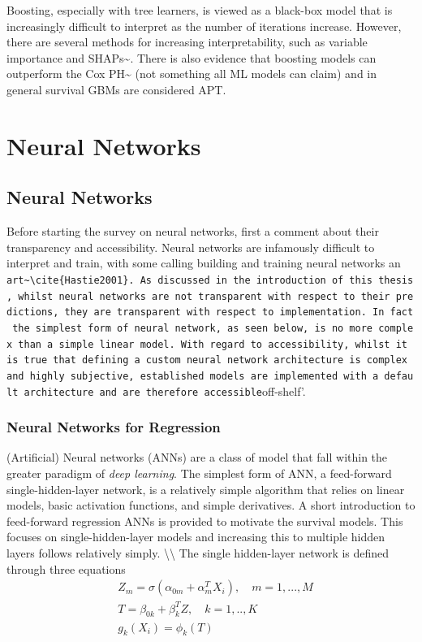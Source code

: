 \documentclass[
  letterpaper,
]{scrbook}
\theoremstyle{plain}
\theoremstyle{definition}
\theoremstyle{remark}
\begin{document}
Boosting, especially with tree learners, is viewed as a black-box model
that is increasingly difficult to interpret as the number of iterations
increase. However, there are several methods for increasing
interpretability, such as variable importance and
SHAPs\textasciitilde{}\cite{Lundberg2017}. There is also evidence that
boosting models can outperform the Cox
PH\textasciitilde{}\cite{Schmid2008b} (not something all ML models can
claim) and in general survival GBMs are considered APT.


\hypertarget{neural-networks}{%
\chapter{Neural Networks}\label{neural-networks}}

\section{Neural Networks}
\label{sec:surv_ml_models_nn}

Before starting the survey on neural networks, first a comment about
their transparency and accessibility. Neural networks are infamously
difficult to interpret and train, with some calling building and
training neural networks an
\texttt{art\textquotesingle{}\textasciitilde{}\textbackslash{}cite\{Hastie2001\}.\ As\ discussed\ in\ the\ introduction\ of\ this\ thesis,\ whilst\ neural\ networks\ are\ not\ transparent\ with\ respect\ to\ their\ predictions,\ they\ are\ transparent\ with\ respect\ to\ implementation.\ In\ fact\ the\ simplest\ form\ of\ neural\ network,\ as\ seen\ below,\ is\ no\ more\ complex\ than\ a\ simple\ linear\ model.\ With\ regard\ to\ accessibility,\ whilst\ it\ is\ true\ that\ defining\ a\ custom\ neural\ network\ architecture\ is\ complex\ and\ highly\ subjective,\ established\ models\ are\ implemented\ with\ a\ default\ architecture\ and\ are\ therefore\ accessible}off-shelf'.

\subsection{Neural Networks for Regression}

(Artificial) Neural networks (ANNs) are a class of model that fall
within the greater paradigm of \emph{deep learning}. The simplest form
of ANN, a feed-forward single-hidden-layer network, is a relatively
simple algorithm that relies on linear models, basic activation
functions, and simple derivatives. A short introduction to feed-forward
regression ANNs is provided to motivate the survival models. This
focuses on single-hidden-layer models and increasing this to multiple
hidden layers follows relatively simply. \textbackslash\textbackslash{}
The single hidden-layer network is defined through three equations
\begin{align}
& Z_m = \sigma(\alpha_{0m} + \alpha^T_mX_i), \quad m = 1,...,M \\
& T = \beta_{0k} + \beta_k^TZ, \quad k = 1,..,K \\
& g_k(X_i) = \phi_k(T)
\end{align}
\end{document}

